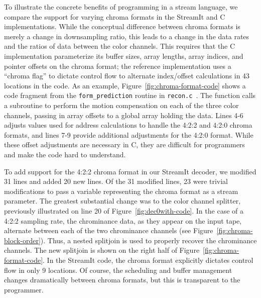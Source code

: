 \label{section:chroma}

To illustrate the concrete benefits of programming in a stream
language, we compare the support for varying chroma formats in the
StreamIt and C implementations.  While the conceptual difference
between chroma formats is merely a change in downsampling ratio, this
leads to a change in the data rates and the ratios of data between the
color channels. This requires that the C implementation parameterize
its buffer sizes, array lengths, array indices, and pointer offsets on
the chroma format; the reference implementation uses a ``chroma flag''
to dictate control flow to alternate index/offset calculations in 43
locations in the code. As an example,
Figure~\ref{fig:chroma-format-code} shows a code fragment from the
\texttt{form\_prediction} routine in
\texttt{recon.c}~\cite{reference-mpeg-c}. The function calls a
subroutine to perform the motion compensation on each of the three
color channels, passing in array offsets to a global array holding the
data. Lines 4-6 adjusts values used for address calculations to handle
the 4:2:2 and 4:2:0 chroma formats, and lines 7-9 provide additional
adjustments for the 4:2:0 format. While these offset adjustments are
necessary in C, they are difficult for programmers and make the code
hard to understand.

To add support for the 4:2:2 chroma format in our StreamIt decoder, we
modified 31 lines and added 20 new lines. Of the 31 modified lines, 23
were trivial modifications to pass a variable representing the chroma
format as a stream parameter. The greatest substantial change was to
the color channel splitter, previously illustrated on line 20 of
Figure~\ref{fig:dec0with-code}. In the case of a 4:2:2 sampling rate,
the chrominance data, as they appear on the input tape, alternate
between each of the two chrominance channels (see
Figure~\ref{fig:chroma-block-order}). Thus, a nested splitjoin is used
to properly recover the chrominance channels. The new splitjoin is
shown on the right half of Figure~\ref{fig:chroma-format-code}.  In
the StreamIt code, the chroma format explicitly dictates control flow
in only 9 locations. Of course, the scheduling and buffer management
changes dramatically between chroma formats, but this is transparent
to the programmer.

